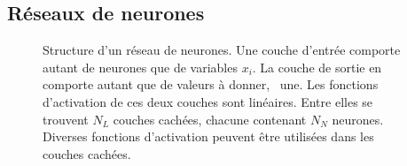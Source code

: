 \subsection{Réseaux de neurones}\label{chapter-ML-section-DNN-networks}


\begin{figure}[h]
\centering

\caption[Structure d'un réseau de neurones.]{Structure d'un réseau de neurones. Une couche d'entrée comporte autant de neurones que de variables $x_i$. La couche de sortie en comporte autant que de valeurs à donner, \ie\ une. Les fonctions d'activation de ces deux couches sont linéaires. Entre elles se trouvent $N_L$ couches cachées, chacune contenant $N_N$ neurones. Diverses fonctions d'activation peuvent être utilisées dans les couches cachées.}
\end{figure}